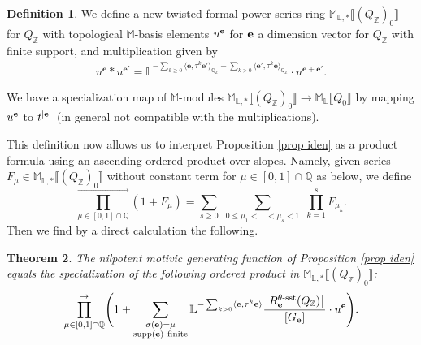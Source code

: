 \documentclass[10pt,a4paper]{amsart}
\DeclareMathOperator{\supp}{supp}
\numberwithin{equation}{section}
\newtheorem{Theorem}{Theorem}[section]
\theoremstyle{definition}
\newtheorem{Definition}[Theorem]{Definition}
\begin{document}
\begin{Definition}
We define a new twisted formal power series ring $\mathbb{M}_{\mathbb{L},*}\llbracket(Q_\mathbb{Z})_0\rrbracket$ for $Q_{\mathbb{Z}}$ with topological $\mathbb{M}$-basis elements $u^{\bf e}$ for ${\bf e}$ a dimension vector for $Q_\mathbb{Z}$ with finite support, and multiplication
given by
\begin{align*}
u^{\mathbf{e}} \ast u^{\mathbf{e}'} = \mathbb{L}^{-\sum_{k\geq 0} \langle\mathbf{e}, {\tau}^k \mathbf{e}'\rangle_{\mathbb{Q}_{\mathbb{Z}}} - \sum_{k > 0} \langle\mathbf{e}', {\tau}^k \mathbf{e}\rangle_{\mathbb{Q}_{\mathbb{Z}}}} \cdot u^{\mathbf{e}+\mathbf{e}'} .
\end{align*}

We have a specialization map of $\mathbb{M}$-modules $\mathbb{M}_{\mathbb{L},*}\llbracket(Q_\mathbb{Z})_0\rrbracket\rightarrow \mathbb{M}_\mathbb{L}\llbracket Q_0\rrbracket$ by mapping $u^{\bf e}$ to $t^{|{\bf e}|}$ (in general not compatible with the multiplications).
\end{Definition}
This definition now allows us to interpret Proposition \ref{prop iden} as a product formula using an ascending ordered product over slopes. Namely, given series $F_\mu\in\mathbb{M}_{\mathbb{L},*}\llbracket(Q_\mathbb{Z})_0\rrbracket$ without constant term for $\mu\in[0,1]\cap\mathbb {Q}$ as below, we define
\[\prod_{\mu\in[0,1]\cap\mathbb{Q}}^\rightarrow(1+F_\mu)=\sum_{s\geq 0} \,\, \sum_{0\leq\mu_1<\dots<\mu_s<1}\,\, \prod_{k=1}^sF_{\mu_k}.\]
Then we find by a direct calculation the following.


\begin{Theorem} \label{theoremwcf}
The nilpotent motivic generating function of Proposition {\rm\ref{prop iden}} equals the specialization of the following ordered product in $\mathbb{M}_{\mathbb{L},*}\llbracket(Q_\mathbb{Z})_0\rrbracket$:
\begin{align*}
\prod^{\rightarrow}_{\mu \in [0,1] \cap \mathbb{Q}} \Biggl(1+ \sum\limits_{\substack{\sigma({\bf e})=\mu \\
\supp(\mathbf{e}) \ \mathrm{finite}}} \mathbb{L}^{- \sum_{k>0} \langle\mathbf{e}, {\tau}^k \mathbf{e}\rangle} \frac{\big[R_{\mathbf{e}}^{\theta\text{\rm -sst}} (Q_{\mathbb{Z}})\big]}{[G_{\mathbf{e}}]} \cdot u^{\mathbf{e}} \Biggr) .
\end{align*}
\end{Theorem}
\end{document}
